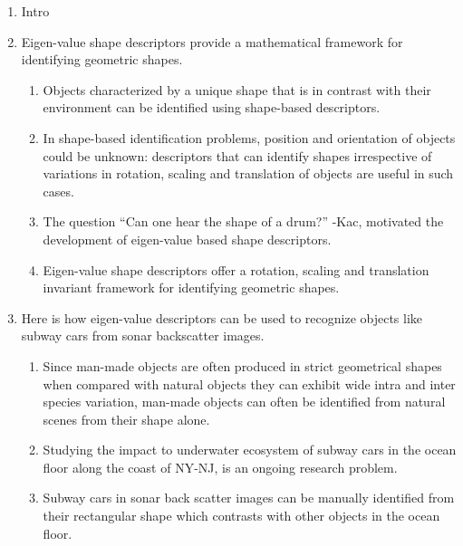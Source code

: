 \documentclass {udthesis}
\begin{document}
\begin{enumerate}[label=Section \arabic*:, start=0]
\item Intro

\item Eigen-value shape descriptors provide a mathematical framework for identifying geometric shapes.

    \begin{enumerate}[label=Para \arabic*:, start=1]
      
	\item Objects characterized by a unique shape that is in contrast with their environment can be identified using shape-based descriptors.
	
	\item In shape-based identification problems, position and orientation of objects could be unknown: descriptors that can identify shapes irrespective of variations in rotation, scaling and translation of objects are useful in such cases.
	
	\item The question ``Can one hear the shape of a drum?'' -Kac, motivated the development of eigen-value based shape descriptors.
	
	\item Eigen-value shape descriptors offer a rotation, scaling and translation invariant framework for identifying geometric shapes.  
	
    \end{enumerate}
    
\item Here is how eigen-value descriptors can be used to recognize objects like subway cars from sonar backscatter images.

    \begin{enumerate}[label=Para \arabic*:, start=1]

      \item Since man-made objects are often produced in strict geometrical shapes when compared with natural objects they can exhibit wide intra and inter species variation, man-made objects can often be identified from natural scenes from their shape alone.
      
      \item Studying the impact to underwater ecosystem of subway cars in the ocean floor along the coast of NY-NJ, is an ongoing research problem.
      
      \item Subway cars in sonar back scatter images can be manually identified from their rectangular shape which contrasts with other objects in the ocean floor.
      

\end{enumerate}
\end{enumerate}
\end{document}
